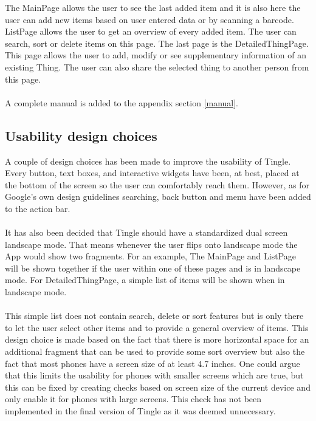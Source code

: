 \documentclass{article}
\begin{document}
The MainPage allows the user to see the last added item and it is also here the user can add new items based on user entered data or by scanning a barcode. ListPage allows the user to get an overview of every added item. The user can search, sort or delete items on this page. The last page is the DetailedThingPage. This page allows the user to add, modify or see supplementary information of an existing Thing. The user can also share the selected thing to another person from this page.
\\\\A complete manual is added to the appendix section \ref{manual}. 

\subsection{Usability design choices}
A couple of design choices has been made to improve the usability of Tingle. Every button, text boxes, and interactive widgets have been, at best, placed at the bottom of the screen so the user can comfortably reach them. However, as for Google's own design guidelines searching, back button and menu have been added to the action bar.
\\\\It has also been decided that Tingle should have a standardized dual screen landscape mode. That means whenever the user flips onto landscape mode the App would show two fragments. For an example, The MainPage and ListPage will be shown together if the user within one of these pages and is in landscape mode. For DetailedThingPage, a simple list of items will be shown when in landscape mode.\\\\This simple list does not contain search, delete or sort features but is only there to let the user select other items and to provide a general overview of items. This design choice is made based on the fact that there is more horizontal space for an additional fragment that can be used to provide some sort overview but also the fact that most phones have a screen size of at least 4.7 inches. One could argue that this limits the usability for phones with smaller screens which are true, but this can be fixed by creating checks based on  screen size of the current device and only enable it for phones with large screens. This check has not been implemented in the final version of Tingle as it was deemed unnecessary.
\end{document}
